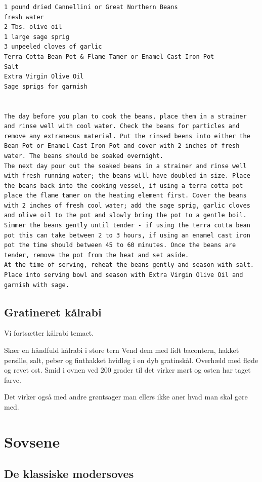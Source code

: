 \documentclass[
]{book}
\begin{document}
\begin{verbatim}
1 pound dried Cannellini or Great Northern Beans
fresh water
2 Tbs. olive oil
1 large sage sprig
3 unpeeled cloves of garlic
Terra Cotta Bean Pot & Flame Tamer or Enamel Cast Iron Pot
Salt
Extra Virgin Olive Oil
Sage sprigs for garnish


The day before you plan to cook the beans, place them in a strainer and rinse well with cool water. Check the beans for particles and remove any extraneous material. Put the rinsed beens into either the Bean Pot or Enamel Cast Iron Pot and cover with 2 inches of fresh water. The beans should be soaked overnight.
The next day pour out the soaked beans in a strainer and rinse well with fresh running water; the beans will have doubled in size. Place the beans back into the cooking vessel, if using a terra cotta pot place the flame tamer on the heating element first. Cover the beans with 2 inches of fresh cool water; add the sage sprig, garlic cloves and olive oil to the pot and slowly bring the pot to a gentle boil. Simmer the beans gently until tender - if using the terra cotta bean pot this can take between 2 to 3 hours, if using an enamel cast iron pot the time should between 45 to 60 minutes. Once the beans are tender, remove the pot from the heat and set aside.
At the time of serving, reheat the beans gently and season with salt. Place into serving bowl and season with Extra Virgin Olive Oil and garnish with sage.
\end{verbatim}

\section{Gratineret kålrabi}\label{gratineret-kuxe5lrabi}

Vi fortsætter kålrabi temaet.

Skær en håndfuld kålrabi i store tern
Vend dem med lidt bacontern, hakket persille, salt, peber og finthakket hvidløg i en dyb gratinskål.
Overhæld med fløde og revet ost.
Smid i ovnen ved 200 grader til det virker mørt og osten har taget farve.

Det virker også med andre grøntsager man ellers ikke aner hvad man skal gøre med.

\chapter{Sovsene}\label{sovsene}

\section{De klassiske modersoves}\label{de-klassiske-modersoves}
\end{document}
